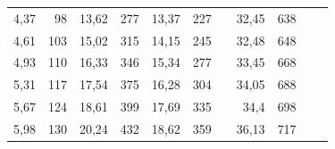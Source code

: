 \documentclass[a4paper,12pt]{article} %
\begin{document}
\begin{table}[]
\begin{tabular}{|rr|rr|rr|lrrll}
\multicolumn{1}{|r|}{4,37}          & 98                                   & \multicolumn{1}{r|}{13,62}         & 277                                  & \multicolumn{1}{r|}{13,37}         & 227                                  & \multicolumn{1}{l|}{} & \multicolumn{1}{r|}{32,45}         & \multicolumn{1}{r|}{638}             &                                    &                                      \\ \cline{1-6} \cline{8-9}
\multicolumn{1}{|r|}{4,61}          & 103                                  & \multicolumn{1}{r|}{15,02}         & 315                                  & \multicolumn{1}{r|}{14,15}         & 245                                  & \multicolumn{1}{l|}{} & \multicolumn{1}{r|}{32,48}         & \multicolumn{1}{r|}{648}             &                                    &                                      \\ \cline{1-6} \cline{8-9}
\multicolumn{1}{|r|}{4,93}          & 110                                  & \multicolumn{1}{r|}{16,33}         & 346                                  & \multicolumn{1}{r|}{15,34}         & 277                                  & \multicolumn{1}{l|}{} & \multicolumn{1}{r|}{33,45}         & \multicolumn{1}{r|}{668}             &                                    &                                      \\ \cline{1-6} \cline{8-9}
\multicolumn{1}{|r|}{5,31}          & 117                                  & \multicolumn{1}{r|}{17,54}         & 375                                  & \multicolumn{1}{r|}{16,28}         & 304                                  & \multicolumn{1}{l|}{} & \multicolumn{1}{r|}{34,05}         & \multicolumn{1}{r|}{688}             &                                    &                                      \\ \cline{1-6} \cline{8-9}
\multicolumn{1}{|r|}{5,67}          & 124                                  & \multicolumn{1}{r|}{18,61}         & 399                                  & \multicolumn{1}{r|}{17,69}         & 335                                  & \multicolumn{1}{l|}{} & \multicolumn{1}{r|}{34,4}          & \multicolumn{1}{r|}{698}             &                                    &                                      \\ \cline{1-6} \cline{8-9}
\multicolumn{1}{|r|}{5,98}          & 130                                  & \multicolumn{1}{r|}{20,24}         & 432                                  & \multicolumn{1}{r|}{18,62}         & 359                                  & \multicolumn{1}{l|}{} & \multicolumn{1}{r|}{36,13}         & \multicolumn{1}{r|}{717}             &                                    &                                      \\ \cline{1-6} \cline{8-9}

\end{tabular}
\end{table}
\end{document}
